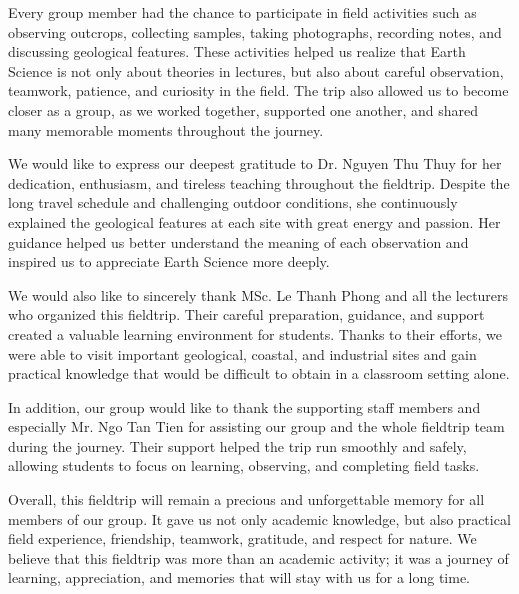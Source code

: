 \documentclass[11pt, a4paper]{article}
\begin{document}
Every group member had the chance to participate in field activities such as observing outcrops, collecting samples, taking photographs, recording notes, and discussing geological features. These activities helped us realize that Earth Science is not only about theories in lectures, but also about careful observation, teamwork, patience, and curiosity in the field. The trip also allowed us to become closer as a group, as we worked together, supported one another, and shared many memorable moments throughout the journey.

We would like to express our deepest gratitude to Dr. Nguyen Thu Thuy for her dedication, enthusiasm, and tireless teaching throughout the fieldtrip. Despite the long travel schedule and challenging outdoor conditions, she continuously explained the geological features at each site with great energy and passion. Her guidance helped us better understand the meaning of each observation and inspired us to appreciate Earth Science more deeply.

We would also like to sincerely thank MSc. Le Thanh Phong and all the lecturers who organized this fieldtrip. Their careful preparation, guidance, and support created a valuable learning environment for students. Thanks to their efforts, we were able to visit important geological, coastal, and industrial sites and gain practical knowledge that would be difficult to obtain in a classroom setting alone.

In addition, our group would like to thank the supporting staff members and especially Mr. Ngo Tan Tien for assisting our group and the whole fieldtrip team during the journey. Their support helped the trip run smoothly and safely, allowing students to focus on learning, observing, and completing field tasks.

Overall, this fieldtrip will remain a precious and unforgettable memory for all members of our group. It gave us not only academic knowledge, but also practical field experience, friendship, teamwork, gratitude, and respect for nature. We believe that this fieldtrip was more than an academic activity; it was a journey of learning, appreciation, and memories that will stay with us for a long time.
\end{document}
